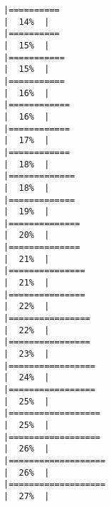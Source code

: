 \documentclass[
]{book}
\begin{document}
\begin{verbatim}
|==========                                                            |  14%  |                                                                              |==========                                                            |  15%  |                                                                              |===========                                                           |  15%  |                                                                              |===========                                                           |  16%  |                                                                              |============                                                          |  16%  |                                                                              |============                                                          |  17%  |                                                                              |============                                                          |  18%  |                                                                              |=============                                                         |  18%  |                                                                              |=============                                                         |  19%  |                                                                              |==============                                                        |  20%  |                                                                              |==============                                                        |  21%  |                                                                              |===============                                                       |  21%  |                                                                              |===============                                                       |  22%  |                                                                              |================                                                      |  22%  |                                                                              |================                                                      |  23%  |                                                                              |=================                                                     |  24%  |                                                                              |=================                                                     |  25%  |                                                                              |==================                                                    |  25%  |                                                                              |==================                                                    |  26%  |                                                                              |===================                                                   |  26%  |                                                                              |===================                                                   |  27%  |                                                                              
\end{verbatim}
\end{document}
